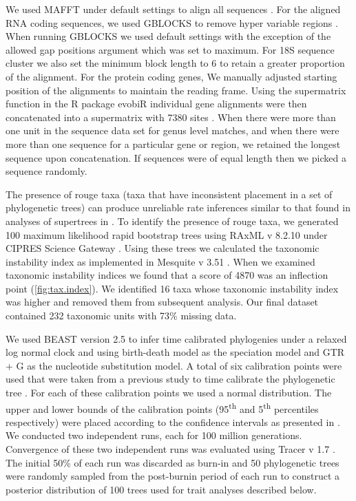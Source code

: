We used MAFFT under default settings to align all sequences \citep{katoh2013mafft}.
For the aligned RNA coding sequences, we used GBLOCKS to remove hyper variable regions \citep{castresana2000gblocks}. 
When running GBLOCKS we used default settings with the exception of the allowed gap positions argument which was set to maximum. 
For 18S sequence cluster we also set the minimum block length to 6 to retain a greater proportion of the alignment. 
For the protein coding genes, We manually adjusted starting position of the alignments to maintain the reading frame. 
Using the supermatrix function in the R package evobiR individual gene alignments were then concatenated into a supermatrix with 7380 sites \citep{blackmon2015evobir}.
When there were more than one unit in the sequence data set for genus level matches, and when there were more than one sequence for a particular gene or region, we retained the longest sequence upon concatenation. If sequences were of equal length then we picked a sequence randomly.

The presence of rouge taxa (taxa that have inconsistent placement in a set of phylogenetic trees) can produce unreliable rate inferences similar to that found in analyses of supertrees in \cite{rabosky2015b}.
To identify the presence of rouge taxa, we generated 100 maximum likelihood rapid bootstrap trees using RAxML v 8.2.10 under CIPRES Science Gateway \citep{stamatakis2014raxml,miller2010cipres}.
Using these trees we calculated the taxonomic instability index as implemented in Mesquite v 3.51 \citep{maddison2018mesquite}.
When we examined taxonomic instability indices we found that a score of 4870 was an inflection point (\cref{fig:tax.index}).
We identified 16 taxa whose taxonomic instability index was higher and removed them from subsequent analysis.
Our final dataset contained 232 taxonomic units with 73\% missing data.

We used BEAST version 2.5 \citep{bouckaert2014beast} to infer time calibrated phylogenies under a relaxed log normal clock and using birth-death model as the speciation model and GTR + G as the nucleotide substitution model.
A total of six calibration points were used that were taken from a previous study to time calibrate the phylogenetic tree \citep{misof2014phylogenomics}.
For each of these calibration points we used a normal distribution.
The upper and lower bounds of the calibration points (95\textsuperscript{th} and 5\textsuperscript{th} percentiles respectively) were placed according to the confidence intervals as presented in \citet{misof2014phylogenomics}. 
We conducted two independent runs, each for 100 million generations.
Convergence of these two independent runs was evaluated using Tracer v 1.7 \citep{rambaut2018tracer}.
The initial 50\% of each run was discarded as burn-in and 50 phylogenetic trees were randomly sampled from the post-burnin period of each run to construct a posterior distribution of 100 trees used for trait analyses described below.

